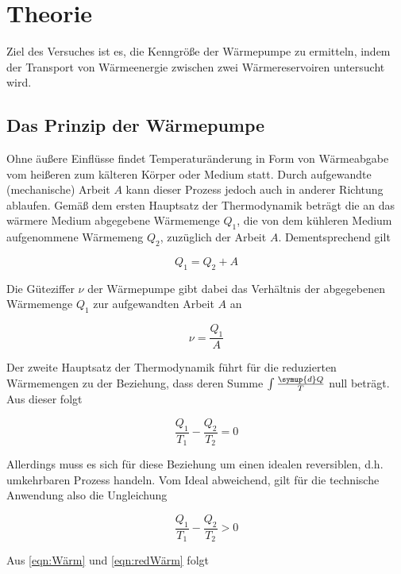 \section{Theorie}
\label{sec:Theorie}

Ziel des Versuches ist es, die Kenngröße der Wärmepumpe zu 
ermitteln, indem der Transport von Wärmeenergie zwischen
zwei Wärmereservoiren untersucht wird.

\subsection{Das Prinzip der Wärmepumpe}

Ohne äußere Einflüsse findet Temperaturänderung in Form von Wärmeabgabe vom heißeren zum kälteren
Körper oder Medium statt. Durch aufgewandte (mechanische) Arbeit $A$ kann dieser Prozess jedoch auch in anderer
Richtung ablaufen. Gemäß dem ersten Hauptsatz der Thermodynamik beträgt die an das wärmere Medium 
abgegebene Wärmemenge $Q_1$, die von dem kühleren Medium aufgenommene Wärmemeng $Q_2$, zuzüglich der Arbeit $A$.
Dementsprechend gilt

\begin{equation}
    Q_1 = Q_2 + A
    \label{eqn:Wärm}
\end{equation}

Die Güteziffer $\nu$ der Wärmepumpe gibt dabei das Verhältnis der abgegebenen Wärmemenge $Q_1$ zur aufgewandten
Arbeit $A$ an

\begin{equation}
    \nu = \frac{Q_1}{A}
    \label{eqn:Güte}
\end{equation}

Der zweite Hauptsatz der Thermodynamik führt für die reduzierten Wärmemengen zu der Beziehung, dass deren Summe 
$\int \frac{\symup{d}Q}{T}$ null beträgt. Aus dieser folgt

\begin{equation}
    \frac{Q_1}{T_1} - \frac{Q_2}{T_2} = 0
    \label{eqn:redWärm}
\end{equation}

Allerdings muss es sich für diese Beziehung um einen idealen reversiblen, d.h. umkehrbaren Prozess handeln. 
Vom Ideal abweichend, gilt für die technische Anwendung also die Ungleichung

\begin{equation}
    \frac{Q_1}{T_1} - \frac{Q_2}{T_2} > 0
    \label{eqn:ungWärme}
\end{equation}

Aus \ref{eqn:Wärm}  und \ref{eqn:redWärm} folgt

